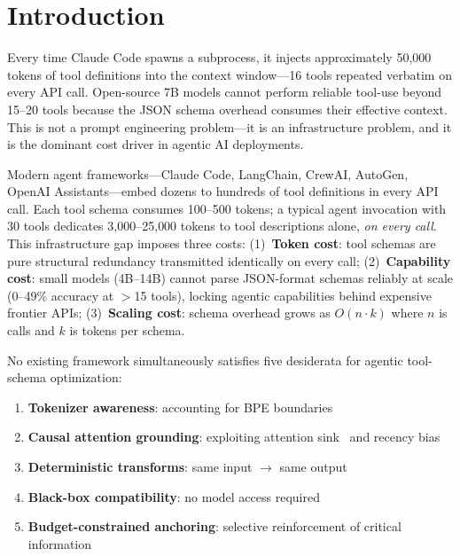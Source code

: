 \section{Introduction}
\label{sec:introduction}

Every time Claude Code spawns a subprocess, it injects approximately 50{,}000 tokens of tool definitions into the context window---16 tools repeated verbatim on every API call.
Open-source 7B models cannot perform reliable tool-use beyond 15--20 tools because the JSON schema overhead consumes their effective context.
This is not a prompt engineering problem---it is an infrastructure problem, and it is the dominant cost driver in agentic AI deployments.

Modern agent frameworks---Claude Code, LangChain, CrewAI, AutoGen, OpenAI Assistants---embed dozens to hundreds of tool definitions in every API call.
Each tool schema consumes 100--500 tokens; a typical agent invocation with 30 tools dedicates 3{,}000--25{,}000 tokens to tool descriptions alone, \emph{on every call}.
This infrastructure gap imposes three costs:
(1)~\textbf{Token cost}: tool schemas are pure structural redundancy transmitted identically on every call;
(2)~\textbf{Capability cost}: small models (4B--14B) cannot parse JSON-format schemas reliably at scale (0--49\% accuracy at $>$15 tools), locking agentic capabilities behind expensive frontier APIs;
(3)~\textbf{Scaling cost}: schema overhead grows as $O(n \cdot k)$ where $n$ is calls and $k$ is tokens per schema.

No existing framework simultaneously satisfies five desiderata for agentic tool-schema optimization:
\begin{enumerate}[noitemsep]
    \item \textbf{Tokenizer awareness}: accounting for BPE boundaries~\cite{sennrich2016neural}
    \item \textbf{Causal attention grounding}: exploiting attention sink~\cite{xiao2023efficient} and recency bias
    \item \textbf{Deterministic transforms}: same input $\to$ same output
    \item \textbf{Black-box compatibility}: no model access required
    \item \textbf{Budget-constrained anchoring}: selective reinforcement of critical information
\end{enumerate}

